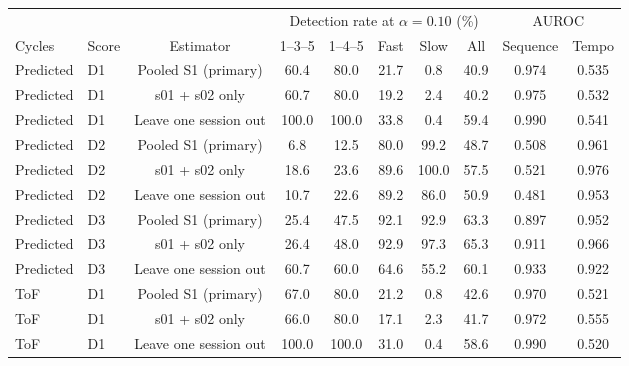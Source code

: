\begin{tabular}{@{}llcccccccc@{}}
\toprule
 & & & \multicolumn{5}{c}{Detection rate at $\alpha=0.10$ (\%)} & \multicolumn{2}{c}{AUROC} \\
\cmidrule(lr){4-8}\cmidrule(lr){9-10}
Cycles & Score & Estimator & 1--3--5 & 1--4--5 & Fast & Slow & All & Sequence & Tempo \\
\midrule
Predicted & D1 & Pooled S1 (primary) & 60.4 & 80.0 & 21.7 & 0.8 & 40.9 & 0.974 & 0.535 \\ %
Predicted & D1 & s01 + s02 only & 60.7 & 80.0 & 19.2 & 2.4 & 40.2 & 0.975 & 0.532 \\ %
Predicted & D1 & Leave one session out & 100.0 & 100.0 & 33.8 & 0.4 & 59.4 & 0.990 & 0.541 \\ %
\addlinespace
Predicted & D2 & Pooled S1 (primary) & 6.8 & 12.5 & 80.0 & 99.2 & 48.7 & 0.508 & 0.961 \\ %
Predicted & D2 & s01 + s02 only & 18.6 & 23.6 & 89.6 & 100.0 & 57.5 & 0.521 & 0.976 \\ %
Predicted & D2 & Leave one session out & 10.7 & 22.6 & 89.2 & 86.0 & 50.9 & 0.481 & 0.953 \\ %
\addlinespace
Predicted & D3 & Pooled S1 (primary) & 25.4 & 47.5 & 92.1 & 92.9 & 63.3 & 0.897 & 0.952 \\ %
Predicted & D3 & s01 + s02 only & 26.4 & 48.0 & 92.9 & 97.3 & 65.3 & 0.911 & 0.966 \\ %
Predicted & D3 & Leave one session out & 60.7 & 60.0 & 64.6 & 55.2 & 60.1 & 0.933 & 0.922 \\ %
\addlinespace
\midrule
ToF & D1 & Pooled S1 (primary) & 67.0 & 80.0 & 21.2 & 0.8 & 42.6 & 0.970 & 0.521 \\ %
ToF & D1 & s01 + s02 only & 66.0 & 80.0 & 17.1 & 2.3 & 41.7 & 0.972 & 0.555 \\ %
ToF & D1 & Leave one session out & 100.0 & 100.0 & 31.0 & 0.4 & 58.6 & 0.990 & 0.520 \\ %

\end{tabular}
